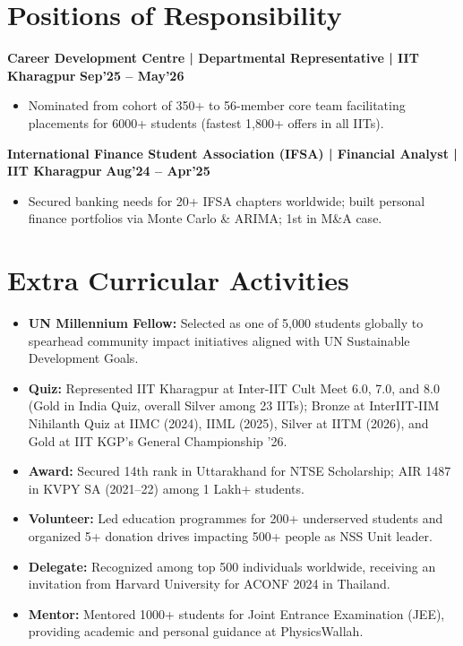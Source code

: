 \documentclass[10pt, a4paper]{article}
\newenvironment{achievelist}{
  \begin{itemize}[leftmargin=1.2em, itemsep=0.5pt, parsep=0pt, topsep=1pt]
    \small
}{
  \end{itemize}
  \vspace{-2pt}
}
\newcommand{\achieve}[1]{\item #1}
\begin{document}
\vspace{-2pt}

\section{Positions of Responsibility}

\textbf{Career Development Centre | Departmental Representative | IIT Kharagpur} \hfill \textbf{\small Sep'25 -- May'26}
\begin{achievelist}
  \achieve{Nominated from cohort of 350+ to 56-member core team facilitating placements for 6000+ students (fastest 1,800+ offers in all IITs).}
\end{achievelist}

\textbf{International Finance Student Association (IFSA) | Financial Analyst | IIT Kharagpur} \hfill \textbf{\small Aug'24 -- Apr'25}
\begin{achievelist}
  \achieve{Secured banking needs for 20+ IFSA chapters worldwide; built personal finance portfolios via Monte Carlo \& ARIMA; 1st in M\&A case.}
\end{achievelist}

\vspace{-2pt}

\section{Extra Curricular Activities}

\begin{itemize}[leftmargin=1.2em, itemsep=0.5pt, parsep=0pt, topsep=1pt]
  \small
  \item \textbf{UN Millennium Fellow:} Selected as one of 5,000 students globally to spearhead community impact initiatives aligned with UN Sustainable Development Goals.
  \item \textbf{Quiz:} Represented IIT Kharagpur at Inter-IIT Cult Meet 6.0, 7.0, and 8.0 (Gold in India Quiz, overall Silver among 23 IITs); Bronze at InterIIT-IIM Nihilanth Quiz at IIMC (2024), IIML (2025), Silver at IITM (2026), and Gold at IIT KGP's General Championship '26.
  \item \textbf{Award:} Secured 14th rank in Uttarakhand for NTSE Scholarship; AIR 1487 in KVPY SA (2021--22) among 1 Lakh+ students.
  \item \textbf{Volunteer:} Led education programmes for 200+ underserved students and organized 5+ donation drives impacting 500+ people as NSS Unit leader.
  \item \textbf{Delegate:} Recognized among top 500 individuals worldwide, receiving an invitation from Harvard University for ACONF 2024 in Thailand.
  \item \textbf{Mentor:} Mentored 1000+ students for Joint Entrance Examination (JEE), providing academic and personal guidance at PhysicsWallah.
\end{itemize}
\end{document}
